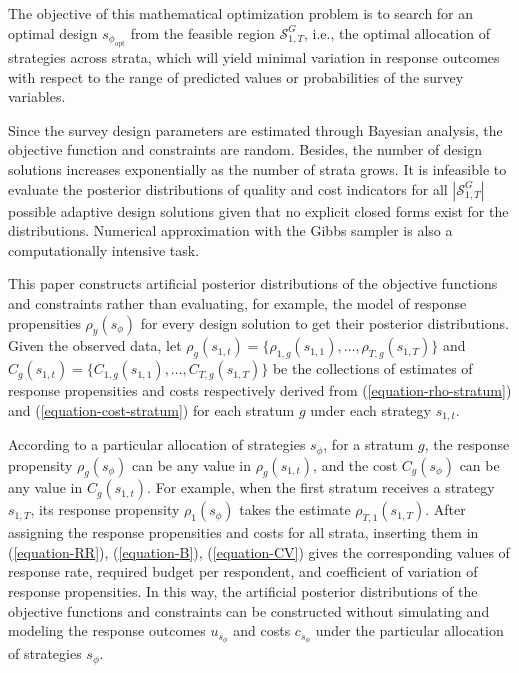 \documentclass[12pt]{article}
\begin{document}
The objective of this mathematical optimization problem is to search for an optimal design $s_{\phi_{\mathrm{opt}}}$ from the feasible region $\mathcal{S}^G_{1,T}$, i.e., the optimal allocation of strategies across strata, which will yield minimal variation in response outcomes with respect to the range of predicted values or probabilities of the survey variables.


Since the survey design parameters are estimated through Bayesian analysis, the objective function and constraints are random. Besides, the number of design solutions increases exponentially as the number of strata grows. It is infeasible to evaluate the posterior distributions of quality and cost indicators for all $|\mathcal{S}^G_{1,T}|$ possible adaptive design solutions given that no explicit closed forms exist for the distributions. Numerical approximation with the Gibbs sampler is also a computationally intensive task.

This paper constructs artificial posterior distributions of the objective functions and constraints rather than evaluating, for example, the model of response propensities $\rho_y(s_\phi)$ for every design solution to get their posterior distributions.
Given the observed data, let $\rho_g(s_{1,t})=\{\rho_{1,g}(s_{1,1}),\dots,\rho_{T,g}(s_{1,T})\}$ and $C_g(s_{1,t})=\{C_{1,g}(s_{1,1}),\dots,C_{T,g}(s_{1,T})\}$ be the collections of estimates of response propensities and costs respectively derived from (\ref{equation-rho-stratum}) and (\ref{equation-cost-stratum}) for each stratum $g$ under each strategy $s_{1,t}$.

According to a particular allocation of strategies $s_\phi$, for a stratum $g$, the response propensity $\rho_g(s_\phi)$ can be any value in $\rho_g(s_{1,t})$, and the cost $C_g(s_\phi)$ can be any value in $C_g(s_{1,t})$.
For example, when the first stratum receives a strategy $s_{1,T}$, its response propensity $\rho_1(s_\phi)$ takes the estimate $\rho_{T,1}(s_{1,T})$.
After assigning the response propensities and costs for all strata, inserting them in (\ref{equation-RR}), (\ref{equation-B}), (\ref{equation-CV}) gives the corresponding values of response rate, required budget per respondent, and coefficient of variation of response propensities.
In this way, the artificial posterior distributions of the objective functions and constraints can be constructed without simulating and modeling the response outcomes $u_{s_\phi}$ and costs $c_{s_\phi}$ under the particular allocation of strategies $s_\phi$.
\end{document}
